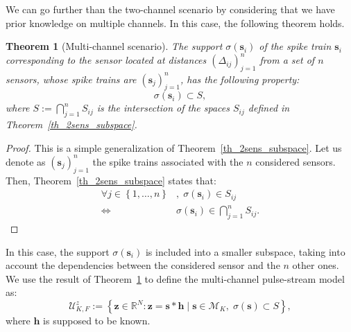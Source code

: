 \documentclass{article}
\newtheorem{theorem}{Theorem}
\newcommand{\vect}[1]{\bm{#1}}
\theoremstyle{definition}
\begin{document}
We can go further than the two-channel scenario by considering that we have prior knowledge on multiple channels. In this case, the following theorem holds.
\begin{theorem}[Multi-channel scenario]
	\label{th_multisens_subspace}
	 The support $\sigma \left(\vect{s}_i\right)$ of the spike train $\vect{s}_i$ corresponding to the sensor located at distances $\left(\Delta_{ij}\right)_{j=1}^n$ from a set of $n$ sensors, whose spike trains are $\left(\vect{s}_j\right)_{j=1}^n$, has the following property:
	\begin{equation*}
	\sigma \left(\vect{s}_i\right) \subset S,
	\end{equation*}
	where $S := \bigcap \limits_{j=1}^{n} S_{ij} $ is the intersection of the spaces $S_{ij}$ defined in Theorem~\ref{th_2sens_subspace}.
\end{theorem}
\begin{proof}
	This is a simple generalization of Theorem~\ref{th_2sens_subspace}. Let us denote as $\left(\vect{s}_j\right)_{j=1}^n$ the spike trains associated with the $n$ considered sensors.
	Then, Theorem~\ref{th_2sens_subspace} states that:
	\begin{align*}
	 \forall j \in \left\lbrace 1,\dots,n \right \rbrace &, \; \sigma \left(\vect{s}_i\right) \in S_{ij} \\
	 \Leftrightarrow & \sigma \left(\vect{s}_i\right) \in \bigcap \limits_{j=1}^{n} S_{ij}. 
	\end{align*} 
\end{proof}

In this case, the support $\sigma\left(\vect{s}_i\right)$ is included into a smaller subspace, taking into account the dependencies between the considered sensor and the $n$ other ones. We use the result of Theorem~\ref{th_multisens_subspace} to define the multi-channel pulse-stream model as:
\begin{equation}
\label{eq_pulse_USstream_model}
\mathcal{U}^z_{K,F}:=\left\lbrace \vect{z} \in \mathbb{R}^N: \vect{z} = \vect{s} \ast \vect{h} \; | \;\vect{s} \in \mathcal{M}_K, \; \sigma\left(\vect{s}\right) \subset S \right\rbrace,
\end{equation} 
where $\vect{h}$ is supposed to be known. 
\end{document}
